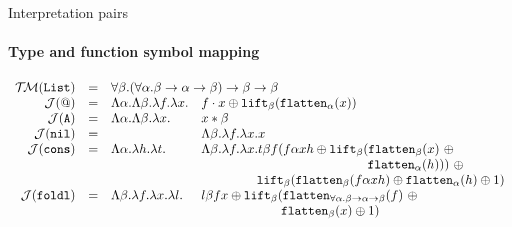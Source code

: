 \documentclass[10pt,presentation,color=names]{beamer}
\newcommand{\arrtype}{\rightarrow}
\newcommand{\quant}[2]{\forall #1.#2}
\newcommand{\abs}[2]{\lambda #1.#2}
\newcommand{\flatten}{\mathtt{flatten}}
\newcommand{\lift}{\mathtt{lift}}
\newcommand{\Typemap}{\mathcal{T\!M}}
\newcommand{\Termmap}{\mathcal{J}}
\newcommand{\List}{\mathtt{List}}
\begin{document}
\begin{frame}{Interpretation pairs}
  \framesubtitle{Type and function symbol mapping}
  \[
  \begin{array}{rcll}
    \Typemap(\List) & = & \multicolumn{2}{l}{
      \quant{\beta}{(\quant{\alpha}{\beta \arrtype
      \alpha \arrtype \beta}) \arrtype \beta \arrtype \beta}}\\
  \Termmap(\mathtt{@}) & = & \Lambda \alpha.\Lambda\beta.
    \lambda f.\lambda x. &
    f \cdot x \oplus \lift_\beta(\flatten_\alpha(x)) \\
  \Termmap(\mathtt{A}) & = & \Lambda \alpha.\Lambda \beta.\lambda x. &
    x * \beta \\
  \Termmap(\mathtt{nil}) & = & & \Lambda \beta.\lambda f.\abs{x}{x} \\
  \Termmap(\mathtt{cons}) & = & \Lambda \alpha.\lambda h.\lambda t. &
    \Lambda \beta.\lambda f.\lambda x.
    t \beta f (f \alpha x h \oplus \lift_\beta(\flatten_\beta(x)\
    \oplus \\
    & & & \phantom{ABCDEFGHIJKLMNOP,} \flatten_\alpha(h)))\ \oplus\  \\
    & & & \phantom{ABCDE\ }
    \lift_\beta(\flatten_\beta(f\alpha x h) \oplus
    \flatten_\alpha(h) \oplus 1) \\
  \Termmap(\mathtt{foldl}) & = & \Lambda \beta.\lambda f. \lambda x.
    \lambda l. & l \beta f x \oplus \lift_\beta(\flatten_{\forall \alpha.
    \beta \arrtype \alpha \arrtype \beta}(f)\ \oplus \\
    & & & \phantom{ABCDEFG\ \ }
    \flatten_\beta(x) \oplus 1) \\
  \end{array}
  \]
\end{frame}
\end{document}
